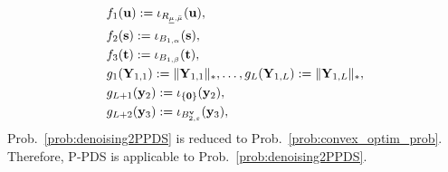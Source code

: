 \begin{align}
	\label{eq:FuncMapping}
	& f_{1} (\mathbf{u}) := \iota_{R_{\underline{\mu},\bar{\mu}}} (\mathbf{u}), \nonumber \\
	& f_{2} (\mathbf{s}) := \iota_{B_{1, \alpha}} (\mathbf{s}), \nonumber \\
	& f_{3} (\mathbf{t}) := \iota_{B_{1, \beta}} (\mathbf{t}), \nonumber \\
	& g_{1} (\mathbf{Y}_{1, 1}) := \| \mathbf{Y}_{1, 1} \|_{*}, \ldots, g_{L}(\mathbf{Y}_{1, L}) := \| \mathbf{Y}_{1, L} \|_{*}, \nonumber \\
	& g_{L + 1} (\mathbf{y}_{2}) := \iota_{\{ \mathbf{0} \}} (\mathbf{y}_{2}), \nonumber \\
	& g_{L + 2} (\mathbf{y}_{3}) := \iota_{B_{2, \varepsilon}^{\mathbf{v}}} (\mathbf{y}_{3}),
\end{align}
Prob.~\eqref{prob:denoising2PPDS} is reduced to Prob.~\eqref{prob:convex_optim_prob}. 
Therefore, P-PDS is applicable to Prob.~\eqref{prob:denoising2PPDS}.





